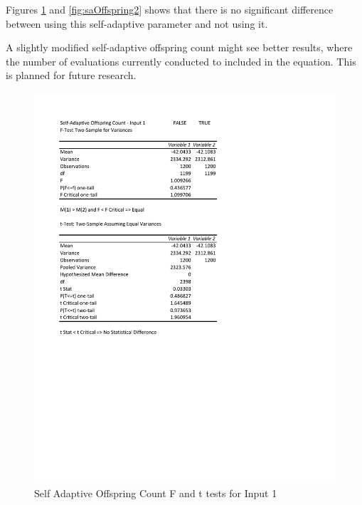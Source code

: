 \documentclass[times]{article}
\begin{document}
	Figures \ref{fig:saOffspring1} and \ref{fig:saOffspring2} shows that there is no significant difference between using this self-adaptive parameter and not using it. 

	A slightly modified self-adaptive offspring count might see better results, where the number of evaluations currently conducted to included in the equation. This is planned for future research.

	\begin{figure}
		\caption{Self Adaptive Offspring Count F and t tests for Input 1}
		\label{fig:saOffspring1}
		\includegraphics[width=\textwidth]{./t_test/S-AOffspringCount1}
	\end{figure}
\end{document}

